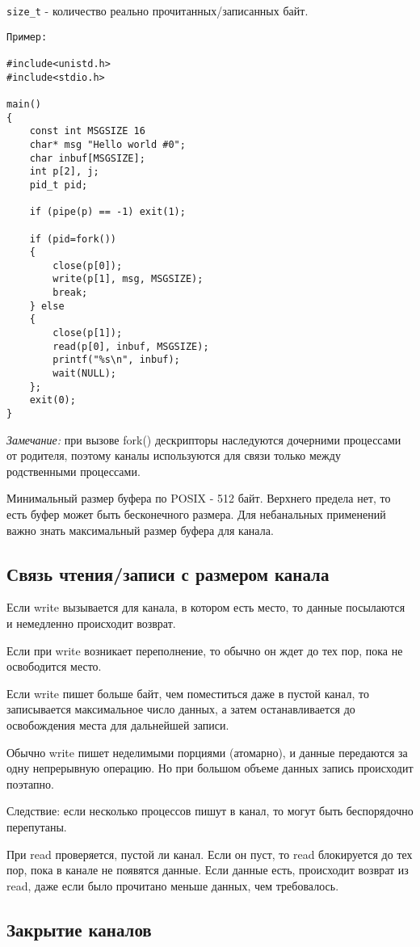 \verb+size_t+ - количество реально прочитанных/записанных байт.

\begin{verbatim}
Пример:

#include<unistd.h>
#include<stdio.h>

main()
{
	const int MSGSIZE 16
	char* msg "Hello world #0";
	char inbuf[MSGSIZE];
	int p[2], j;
	pid_t pid;

	if (pipe(p) == -1) exit(1);

	if (pid=fork())
	{
		close(p[0]);
		write(p[1], msg, MSGSIZE);
		break;
	} else 
	{
		close(p[1]);
		read(p[0], inbuf, MSGSIZE);
		printf("%s\n", inbuf);
		wait(NULL);
	};
	exit(0);
}
\end{verbatim}

\emph{Замечание:} при вызове fork() дескрипторы наследуются дочерними процессами от родителя, поэтому каналы используются для связи только между родственными процессами.

Минимальный размер буфера по POSIX - 512 байт. Верхнего предела нет, то есть буфер может быть бесконечного размера. Для небанальных применений важно знать максимальный размер буфера для канала.

\subsection{Связь чтения/записи с размером канала}

Если write вызывается для канала, в котором есть место, то данные посылаются и немедленно происходит возврат.

Если при write возникает переполнение, то обычно он ждет до тех пор, пока не освободится место.

Если write пишет больше байт, чем поместиться даже в пустой канал, то записывается максимальное число данных, а затем останавливается до освобождения места для дальнейшей записи.

Обычно write пишет неделимыми порциями (атомарно), и данные передаются за одну непрерывную операцию. Но при большом объеме данных запись происходит поэтапно.

Следствие: если несколько процессов пишут в канал, то могут быть беспорядочно перепутаны.

При read проверяется, пустой ли канал. Если он пуст, то read блокируется до тех пор, пока в канале не появятся данные. Если данные есть, происходит возврат из read, даже если было прочитано меньше данных, чем требовалось.

\subsection{Закрытие каналов}

